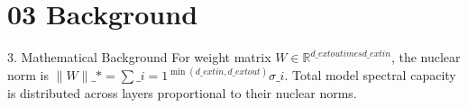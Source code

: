 \section{03 Background}

 3. Mathematical Background
For weight matrix $W \in \mathbb{R}^{d\_{	ext{out}} 	imes d\_{	ext{in}}}$, the nuclear norm is $\|W\|\_* = \sum\_{i=1}^{\min(d\_{	ext{in}}, d\_{	ext{out}})} \sigma\_i$. Total model spectral capacity is distributed across layers proportional to their nuclear norms.
